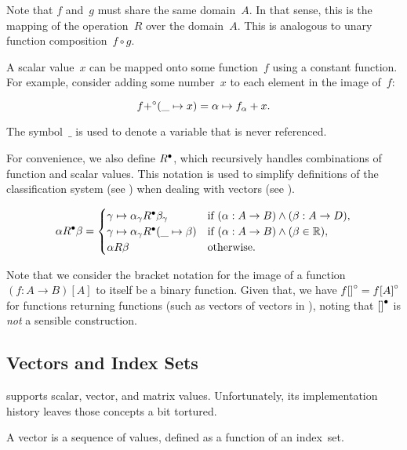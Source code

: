Note that $f$ and~$g$ must share the same domain~$A$.
In that sense,
  this is the mapping of the operation~$R$ over the domain~$A$.
This is analogous to unary function composition~$f\circ g$.

A scalar value~$x$ can be mapped onto some function~$f$ using a constant
  function.
For example,
  consider adding some number~$x$ to each element in the image of~$f$:

\begin{equation*}
  f {+}^\circ (\_\mapsto x) = \alpha \mapsto f_\alpha + x.
\end{equation*}

The symbol~$\_$ is used to denote a variable that is never referenced.

For convenience,
  we also define ${R}^\bullet$,
  which recursively handles combinations of function and scalar values.
This notation is used to simplify definitions of the classification system
  (see )
  when dealing with vectors
    (see ).

\begin{equation}\label{eq:bicompi}
  \alpha {R}^\bullet \beta =
    \begin{cases}
      \gamma \mapsto \alpha_\gamma {R}^\bullet \beta_\gamma
        &\text{if } (\alpha : A\rightarrow B) \wedge (\beta : A\rightarrow D),\\
      \gamma \mapsto \alpha_\gamma {R}^\bullet (\_ \mapsto \beta)
        &\text{if } (\alpha : A\rightarrow B) \wedge (\beta \in\mathbb{R}),\\
      \alpha R \beta &\text{otherwise}.
    \end{cases}
\end{equation}

Note that we consider the bracket notation for the image of a function
  $(f:A\rightarrow B)[A]$ to itself be a binary function.
Given that, we have $f{[]}^\circ = f{[A]}^\circ$ for functions returning
  functions (such as vectors of vectors in ),
    noting that ${[]}^\bullet$ is \emph{not} a sensible construction.


\subsection{Vectors and Index Sets}
\tame{} supports scalar, vector, and matrix values.
Unfortunately,
  its implementation history leaves those concepts a bit tortured.

A vector is a sequence of values, defined as a function of
  an index~set.


